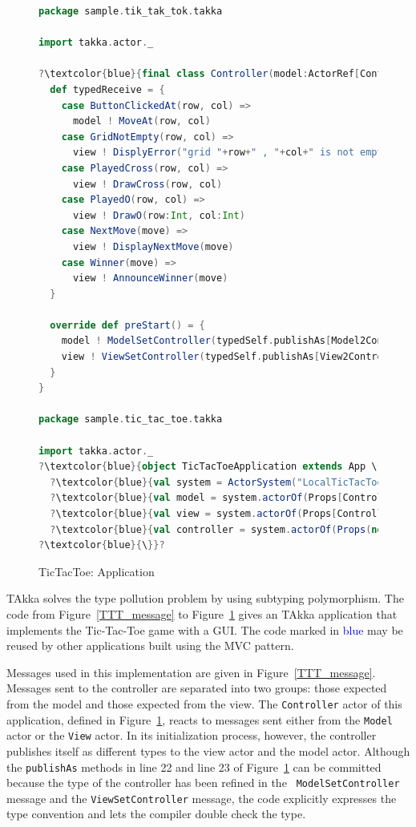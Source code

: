 \begin{figure}[p]
\begin{lstlisting}[language=scala, escapechar=?]
package sample.tik_tak_tok.takka

import takka.actor._

?\textcolor{blue}{final class Controller(model:ActorRef[Controller2ModelMessage], view:ActorRef[Controller2ViewMessage]) extends Actor[ControllerMessage]}? {
  def typedReceive = {
    case ButtonClickedAt(row, col) =>
      model ! MoveAt(row, col)
    case GridNotEmpty(row, col) =>
      view ! DisplyError("grid "+row+" , "+col+" is not empty")
    case PlayedCross(row, col) =>
      view ! DrawCross(row, col)
    case PlayedO(row, col) =>
      view ! DrawO(row:Int, col:Int)
    case NextMove(move) =>
      view ! DisplayNextMove(move)
    case Winner(move) =>
      view ! AnnounceWinner(move)
  }
  
  override def preStart() = {
    model ! ModelSetController(typedSelf.publishAs[Model2ControllerMessage])
    view ! ViewSetController(typedSelf.publishAs[View2ControllerMessage])
  }
}

package sample.tic_tac_toe.takka

import takka.actor._
?\textcolor{blue}{object TicTacToeApplication extends App \{}?
  ?\textcolor{blue}{val system = ActorSystem("LocalTicTacToe")}?
  ?\textcolor{blue}{val model = system.actorOf(Props[Controller2ModelMessage, Model], "model")}?
  ?\textcolor{blue}{val view = system.actorOf(Props[Controller2ViewMessage, View], "view")}?
  ?\textcolor{blue}{val controller = system.actorOf(Props(new Controller(model, view)), "controller")  }?
?\textcolor{blue}{\}}?
\end{lstlisting}
\caption{TicTacToe: Application}
\label{TTT_controller}
\end{figure}

TAkka solves the type pollution problem by using subtyping polymorphism.  The code from 
Figure~\ref{TTT_message} to Figure~\ref{TTT_controller} gives an TAkka 
application that implements the Tic-Tac-Toe game with a GUI.  The code marked 
in \textcolor{blue}{blue} may be reused by other applications built 
using the MVC pattern.


Messages used in this implementation are given in Figure~\ref{TTT_message}. 
Messages sent to the controller are separated into two groups: those expected 
from the model and those expected from the view.  The {\tt Controller} actor of 
this application, defined in Figure~\ref{TTT_controller}, reacts to messages 
sent either from the {\tt Model} actor or the {\tt View} actor.  In its 
initialization process, however, the controller publishes itself as different 
types to the view actor and the model actor.  Although the {\tt publishAs} 
methods in line 22 and line 23 of Figure~\ref{TTT_controller} can be committed 
because the type of the controller has been refined in the {\tt 
ModelSetController} message and the {\tt ViewSetController} message, the code
explicitly expresses the type convention and lets the compiler double check the 
type.

